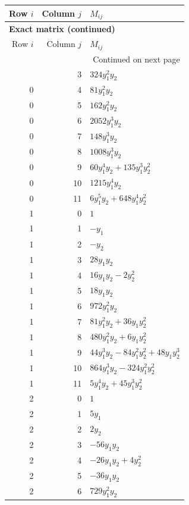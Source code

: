\documentclass[10pt,a4paper]{article}
\begin{document}
{\small\setlength{\tabcolsep}{7pt}\begin{longtable}{rrp{125mm}}
\toprule Row $i$ & Column $j$ & $M_{ij}$\\\midrule\endfirsthead
\multicolumn{3}{l}{\textbf{Exact matrix (continued)}}\\
\toprule Row $i$ & Column $j$ & $M_{ij}$\\\midrule\endhead
\midrule\multicolumn{3}{r}{Continued on next page}\\\endfoot\bottomrule\endlastfoot
0 & 3 & $324 y_{1}^{2} y_{2}$\\
0 & 4 & $81 y_{1}^{2} y_{2}$\\
0 & 5 & $162 y_{1}^{2} y_{2}$\\
0 & 6 & $2052 y_{1}^{3} y_{2}$\\
0 & 7 & $148 y_{1}^{3} y_{2}$\\
0 & 8 & $1008 y_{1}^{3} y_{2}$\\
0 & 9 & $60 y_{1}^{4} y_{2} + 135 y_{1}^{3} y_{2}^{2}$\\
0 & 10 & $1215 y_{1}^{4} y_{2}$\\
0 & 11 & $6 y_{1}^{5} y_{2} + 648 y_{1}^{4} y_{2}^{2}$\\
1 & 0 & $1$\\
1 & 1 & $- y_{1}$\\
1 & 2 & $- y_{2}$\\
1 & 3 & $28 y_{1} y_{2}$\\
1 & 4 & $16 y_{1} y_{2} - 2 y_{2}^{2}$\\
1 & 5 & $18 y_{1} y_{2}$\\
1 & 6 & $972 y_{1}^{2} y_{2}$\\
1 & 7 & $81 y_{1}^{2} y_{2} + 36 y_{1} y_{2}^{2}$\\
1 & 8 & $480 y_{1}^{2} y_{2} + 6 y_{1} y_{2}^{2}$\\
1 & 9 & $44 y_{1}^{3} y_{2} - 84 y_{1}^{2} y_{2}^{2} + 48 y_{1} y_{2}^{3}$\\
1 & 10 & $864 y_{1}^{3} y_{2} - 324 y_{1}^{2} y_{2}^{2}$\\
1 & 11 & $5 y_{1}^{4} y_{2} + 45 y_{1}^{3} y_{2}^{2}$\\
2 & 0 & $1$\\
2 & 1 & $5 y_{1}$\\
2 & 2 & $2 y_{2}$\\
2 & 3 & $- 56 y_{1} y_{2}$\\
2 & 4 & $- 26 y_{1} y_{2} + 4 y_{2}^{2}$\\
2 & 5 & $- 36 y_{1} y_{2}$\\
2 & 6 & $729 y_{1}^{2} y_{2}$\\

\end{longtable}}
\end{document}
